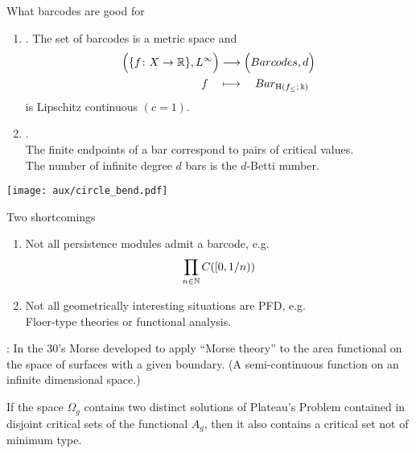 \begin{frame}[fragile]{What barcodes are good for}
	\pause
	\begin{enumerate}
		\item {}.
		The set of barcodes is a metric space and
		\begin{align*}
			\Big( \{f \colon X \to \mathbb{R}\}, L^\infty	\Big)
			&\longrightarrow
			\Big( Barcodes, d \Big) \\
			f \quad &\longmapsto \quad Bar_{\mathrm{H}(f_{\le};\, \Bbbk)}
		\end{align*}
		is Lipschitz continuous $(c=1)$.

		\vspace*{5pt}\pause
		\item {}. \\
		\medskip
		The finite endpoints of a bar correspond to pairs of critical values. \\
		\medskip
		The number of infinite degree $d$ bars is the $d$-Betti number. \\
	\end{enumerate}
	\begin{center}
		\texttt{[image: aux/circle\_bend.pdf]}\\
	\end{center}
	\hspace*{4.5cm}
\end{frame}

\begin{frame}{Two shortcomings}
	\pause\vskip-0pt
	\begin{enumerate}
		\item Not all persistence modules admit a barcode, e.g.
		\[
		\prod_{n \in \mathbb{N}} C([0,1/n))
		\]
		\pause\vspace*{-10pt}
		\item Not all geometrically interesting situations are PFD, e.g. \\
		Floer-type theories or functional analysis.
	\end{enumerate}
	\medskip\pause
	: In the 30's Morse developed 
	to apply ``Morse theory'' to the area functional on the space of surfaces with a given boundary.
	(A semi-continuous function on an infinite dimensional space.)
	\medskip\pause
	\begin{theorem}
		If the space $\Omega_g$ contains two distinct solutions of Plateau's Problem contained in disjoint critical sets of the functional $A_g$, then it also contains a critical set not of minimum type.
	\end{theorem}
\end{frame}

